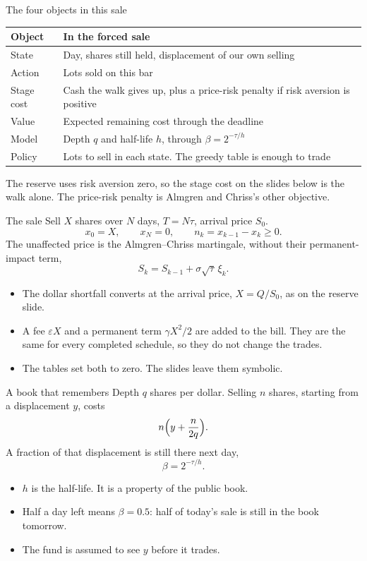 \documentclass[aspectratio=169,10pt]{beamer}
\newcommand{\currentsource}{}
\newcommand{\framesource}[1]{\gdef\currentsource{#1}}
\newcommand{\aiassisted}{AI assisted, via Grok 4.7}
\begin{document}
\begin{frame}{The four objects in this sale}
\framesource{Sutton and Barto, 2018, \S 1.3. Sale column: \aiassisted.}
\small
\begin{tabular}{@{}lp{}@{}}
\toprule
Object & In the forced sale \\
\midrule
State & Day, shares still held, displacement of our own selling \\
Action & Lots sold on this bar \\
Stage cost & Cash the walk gives up, plus a price-risk penalty if risk aversion is positive \\
Value & Expected remaining cost through the deadline \\
Model & Depth \(q\) and half-life \(h\), through \(\beta=2^{-\tau/h}\) \\
Policy & Lots to sell in each state. The greedy table is enough to trade \\
\bottomrule
\end{tabular}
\vspace{0.7em}

The reserve uses risk aversion zero, so the stage cost on the slides below is the walk alone. The price-risk penalty is Almgren and Chriss's other objective.
\end{frame}

\begin{frame}{The sale}
\framesource{Almgren and Chriss, 2001}
Sell \(X\) shares over \(N\) days, \(T=N\tau\), arrival price \(S_0\).
\[
x_0=X,\qquad x_N=0,\qquad n_k=x_{k-1}-x_k\geq 0.
\]
The unaffected price is the Almgren--Chriss martingale, without their permanent-impact term,
\[
S_k=S_{k-1}+\sigma\sqrt{\tau}\,\xi_k.
\]
\begin{itemize}
\item The dollar shortfall converts at the arrival price, \(X=Q/S_0\), as on the reserve slide.
\item A fee \(\varepsilon X\) and a permanent term \(\gamma X^{2}/2\) are added to the bill. They are the same for every completed schedule, so they do not change the trades.
\item The tables set both to zero. The slides leave them symbolic.
\end{itemize}
\end{frame}

\begin{frame}{A book that remembers}
\framesource{Obizhaeva and Wang, 2013, Proposition 3}
Depth \(q\) shares per dollar. Selling \(n\) shares, starting from a displacement \(y\), costs
\[
n\Bigl(y+\frac{n}{2q}\Bigr).
\]
A fraction of that displacement is still there next day,
\[
\beta=2^{-\tau/h}.
\]
\begin{itemize}
\item \(h\) is the half-life. It is a property of the public book.
\item Half a day left means \(\beta=0.5\): half of today's sale is still in the book tomorrow.
\item The fund is assumed to see \(y\) before it trades.
\end{itemize}
\end{frame}
\end{document}
